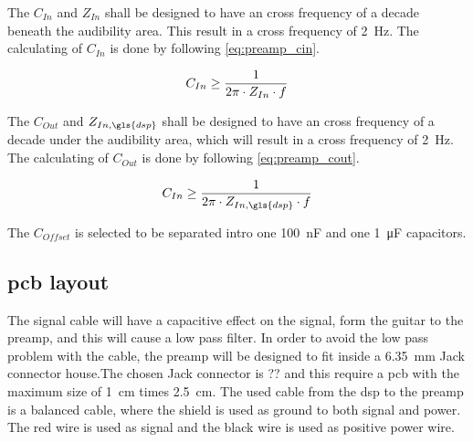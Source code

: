The $C_{In}$ and $Z_{In}$ shall be designed to have an cross frequency of a decade beneath the audibility area. This result in a cross frequency of \SI{2}{\hertz}. The calculating of $C_{In}$ is done by following \autoref{eq:preamp_cin}.

\begin{equation}\label{eq:preamp_cin}
        C_{In} \geq  \frac{1}{2 \pi \cdot Z_{In} \cdot f}
        \addunit{\si{\farad}}
    \end{equation}

    \startexplain
    \stopexplain
    
    The $C_{Out}$ and $Z_{In,\gls{dsp}}$ shall be designed to have an cross frequency of a decade under the audibility area, which will result in a cross frequency of \SI{2}{\hertz}. The calculating of $C_{Out}$ is done by following \autoref{eq:preamp_cout}.

\begin{equation}\label{eq:preamp_cout}
        C_{In} \geq  \frac{1}{2 \pi \cdot Z_{In,\gls{dsp}} \cdot f}
        \addunit{\si{\farad}}
    \end{equation}

    \startexplain
    \stopexplain
    
 The $C_{Offset}$ is selected to be separated intro one \SI{100}{\nano\farad} and one \SI{1}{\micro\farad} capacitors.
 
\subsection{\gls{pcb} layout} 
The signal cable will have a capacitive effect on the signal, form the guitar to the \gls{preamp}, and this will cause a low pass filter. In order to avoid the low pass problem with the cable, the \gls{preamp} will be designed to fit inside a \SI{6.35}{\milli\meter} Jack connector house.The chosen Jack connector is ?? and this require a \gls{pcb} with the maximum size of  \SI{1}{\centi\meter} times \SI{2.5}{\centi\meter}. The used cable from the \gls{dsp} to the \gls{preamp} is a balanced cable, where the shield is used as ground to both signal and power. The red wire is used as signal and the black wire is used as positive power wire.
 
 
 